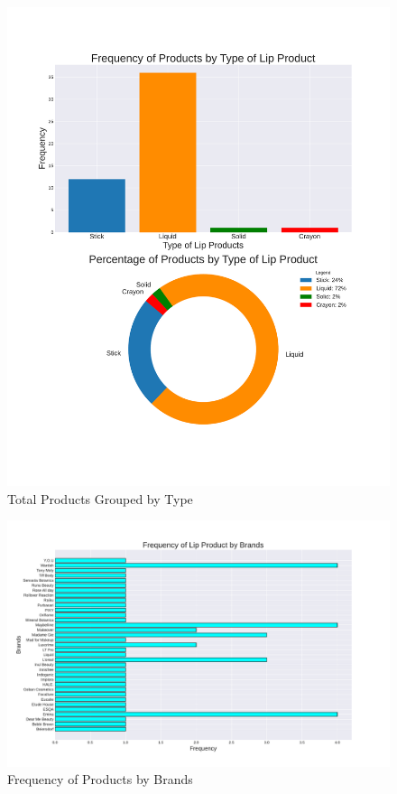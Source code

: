 \documentclass{article}
\begin{document}
\begin{center}
    \begin{figure}[htbp]
        \centering
        \includegraphics[scale=0.6]{../images/TotalProductsbyType.pdf}
        \caption{Total Products Grouped by Type}
        \label{Products_by_Type}
    \end{figure}

    \begin{figure}[htbp]
        \centering
        \includegraphics[scale=0.5]{../images/Brand_Frequency.pdf}
        \caption{Frequency of Products by Brands}
        \label{Products_by_Brands}
    \end{figure}


\end{center}
\end{document}
